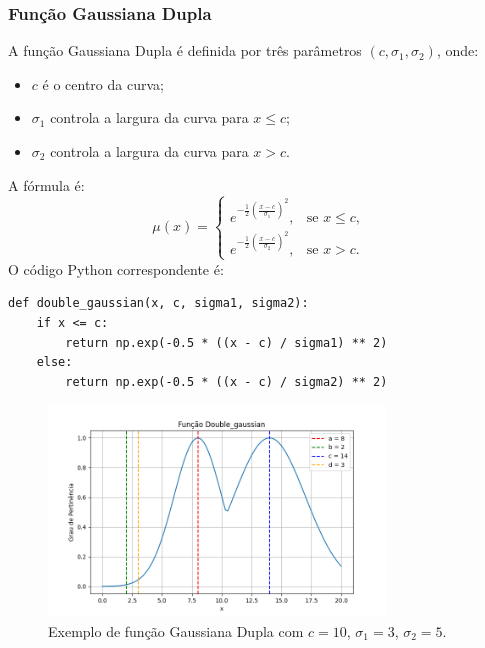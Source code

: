 \documentclass[a4paper,12pt]{article}
\begin{document}
\subsubsection{Função Gaussiana Dupla}
A função Gaussiana Dupla é definida por três parâmetros $(c, \sigma_1, \sigma_2)$, onde:
\begin{itemize}
    \item $c$ é o centro da curva;
    \item $\sigma_1$ controla a largura da curva para $x \leq c$;
    \item $\sigma_2$ controla a largura da curva para $x > c$.
\end{itemize}
A fórmula é:
\[
\mu(x) =
\begin{cases}
e^{-\frac{1}{2} \left( \frac{x - c}{\sigma_1} \right)^2}, & \text{se } x \leq c, \\
e^{-\frac{1}{2} \left( \frac{x - c}{\sigma_2} \right)^2}, & \text{se } x > c.
\end{cases}
\]
O código Python correspondente é:
\begin{verbatim}
def double_gaussian(x, c, sigma1, sigma2):
    if x <= c:
        return np.exp(-0.5 * ((x - c) / sigma1) ** 2)
    else:
        return np.exp(-0.5 * ((x - c) / sigma2) ** 2)
\end{verbatim}
\begin{figure}[H]
    \centering
    \includegraphics[width=0.8\textwidth]{img/double_gaussian.png}
    \caption{Exemplo de função Gaussiana Dupla com $c=10$, $\sigma_1=3$, $\sigma_2=5$.}
\end{figure}
\end{document}
